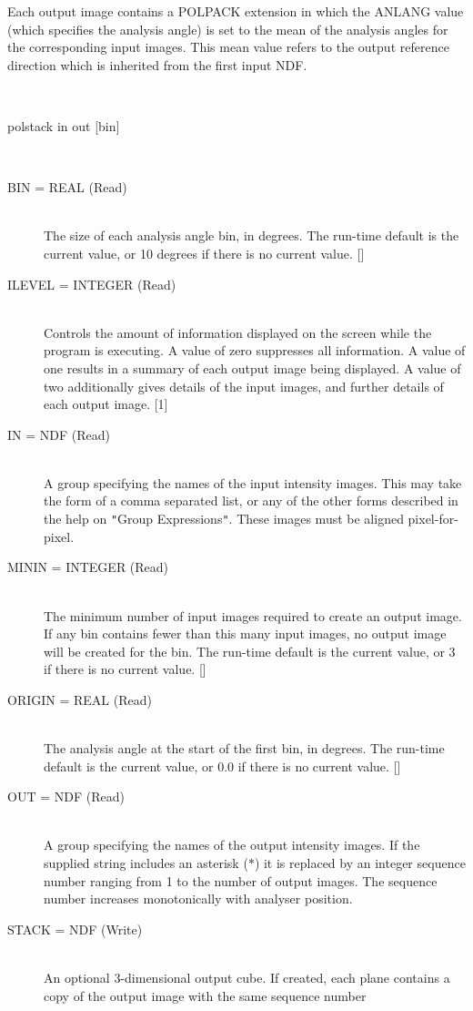 \documentclass[twoside,11pt]{article}
\renewcommand{\_}{\texttt{\symbol{95}}}
\newcommand{\sstusage}[1]{\item[Usage:] \mbox{}
\\[1.3ex]{\raggedright \ssttt #1}}
\newcommand{\sstparameters}[1]{
   \item[Parameters:] \mbox{} \\
   \vspace{-3.5ex}
   \begin{description}
      #1
   \end{description}
}
\newcommand{\sstsubsection}[1]{ \item[{#1}] \mbox{} \\}
\newcommand{\sstusage}[1]{\item[Usage:]
      \begin{description}
         {\ssttt #1}
      \end{description}
      \\
   }
\newcommand{\sstparameters}[1]{
      \item[Parameters:] \\
      \begin{description}
         #1
      \end{description}
      \\
   }
\newcommand{\sstsubsection}[1]{\item[{#1}]}
\begin{document}
{{      Each output image contains a POLPACK extension in which the ANLANG
      value (which specifies the analysis angle) is set to the mean of the
      analysis angles for the corresponding input images. This mean value
      refers to the output reference direction which is inherited from
      the first input NDF.
   }
   \sstusage{
      polstack in out [bin]
   }
   \sstparameters{
      \sstsubsection{
         BIN = \_REAL (Read)
      }{
         The size of each analysis angle bin, in degrees. The run-time
         default is the current value, or 10 degrees if there is no
         current value. []
      }
      \sstsubsection{
         ILEVEL = \_INTEGER (Read)
      }{
         Controls the amount of information displayed on the screen while
         the program is executing. A value of zero suppresses all
         information. A value of one results in a summary of each
         output image being displayed. A value of two additionally gives
         details of the input images, and further details of each output
         image. [1]
      }
      \sstsubsection{
         IN = NDF (Read)
      }{
         A group specifying the names of the input intensity images. This
         may take the form of a comma separated list, or any of the other
         forms described in the help on {\tt "}Group Expressions{\tt "}. These images
         must be aligned pixel-for-pixel.
      }
      \sstsubsection{
         MININ = \_INTEGER (Read)
      }{
         The minimum number of input images required to create an output
         image. If any bin contains fewer than this many input images, no
         output image will be created for the bin. The run-time default
         is the current value, or 3 if there is no current value. []
      }
      \sstsubsection{
         ORIGIN = \_REAL (Read)
      }{
         The analysis angle at the start of the first bin, in degrees.
         The run-time default is the current value, or 0.0 if there is no
         current value. []
      }
      \sstsubsection{
         OUT = NDF (Read)
      }{
         A group specifying the names of the output intensity images. If
         the supplied string includes an asterisk ($*$) it is replaced by
         an integer sequence number ranging from 1 to the number of
         output images. The sequence number increases monotonically with
         analyser position.
      }
      \sstsubsection{
         STACK = NDF (Write)
      }{
         An optional 3-dimensional output cube. If created, each plane
         contains a copy of the output image with the same sequence number
}}}
\end{document}
